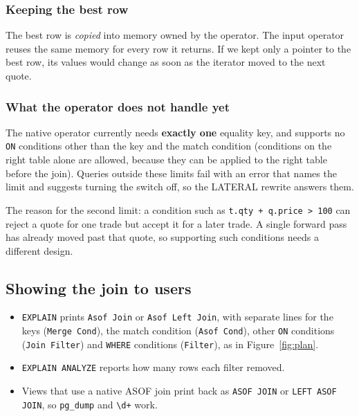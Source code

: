 \documentclass[11pt,a4paper]{article}
\newcommand{\code}[1]{\texttt{#1}}
\begin{document}
\subsubsection{Keeping the best row}

The best row is \emph{copied} into memory owned by the operator. The input operator
reuses the same memory for every row it returns. If we kept only a pointer to the best
row, its values would change as soon as the iterator moved to the next quote.

\subsubsection{What the operator does not handle yet}
\label{sec:executor-limits}

The native operator currently needs \textbf{exactly one} equality key, and supports no
\code{ON} conditions other than the key and the match condition (conditions on the right
table alone are allowed, because they can be applied to the right table before the join).
Queries outside these limits fail with an error that names the limit and suggests turning
the switch off, so the LATERAL rewrite answers them.

The reason for the second limit: a condition such as \code{t.qty + q.price > 100} can
reject a quote for one trade but accept it for a later trade. A single forward pass has
already moved past that quote, so supporting such conditions needs a different design.

\subsection{Showing the join to users}

\begin{itemize}
  \item \code{EXPLAIN} prints \code{Asof Join} or \code{Asof Left Join}, with separate
        lines for the keys (\code{Merge Cond}), the match condition (\code{Asof Cond}),
        other \code{ON} conditions (\code{Join Filter}) and \code{WHERE} conditions
        (\code{Filter}), as in Figure~\ref{fig:plan}.
  \item \code{EXPLAIN ANALYZE} reports how many rows each filter removed.
  \item Views that use a native ASOF join print back as \code{ASOF JOIN} or
        \code{LEFT ASOF JOIN}, so \code{pg\_dump} and \code{\textbackslash d+} work.
\end{itemize}
\end{document}
